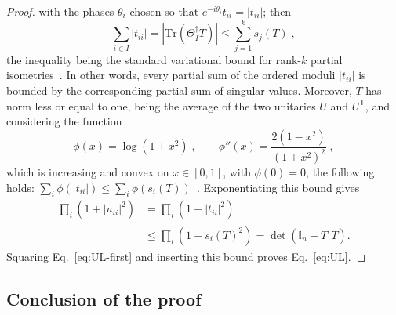 \documentclass[aps,prl,twocolumn,superscriptaddress,reprint,longbibliography,nofootinbib]{revtex4-2}
\newcommand{\trans}{\mathsf{T}}
\begin{document}
\begin{proof}
with the phases $\theta_i$ chosen so that $e^{-i\theta_i}t_{ii}=|t_{ii}|$; then
\begin{equation}
    \sum_{i\in I}|t_{ii}|=\left|\mathrm{Tr}(\Theta_I^\dagger T)\right|\le\sum_{j=1}^ks_j(T)\;,
\end{equation} 
the inequality being the standard variational bound for rank-$k$ partial isometries~\cite{bhatia2013matrix}. In other words, every partial sum of the ordered moduli $|t_{ii}|$ is bounded by the corresponding partial sum of singular values. Moreover, $T$ has norm less or equal to one, being the average of the two unitaries $U$ and $U^{\trans}$, and considering the function
\begin{equation}
    \phi(x)=\log(1+x^2)\;,\qquad \phi''(x)=\frac{2(1-x^2)}{(1+x^2)^2}\;,
\end{equation}
which is increasing and convex on $x \in[0,1]$, with $\phi(0)=0$, the following holds: $\sum_i\phi(|t_{ii}|)\le\sum_i\phi(s_i(T))$~\cite{bhatia2013matrix}. Exponentiating this bound gives
\begin{equation}
\begin{split}
\prod_i\left(1+|u_{ii}|^2\right)&=\prod_i\left(1+|t_{ii}|^2\right)\\&\le\prod_i\left(1+s_i(T)^2\right)=\det(\mathbb{I}_n+T^\dagger T).\end{split}
\end{equation} 
Squaring Eq.~\eqref{eq:UL-first} and inserting this bound proves Eq.~\eqref{eq:UL}.
\end{proof}

\subsection{Conclusion of the proof}
\label{app:proof:completion}
\end{document}
